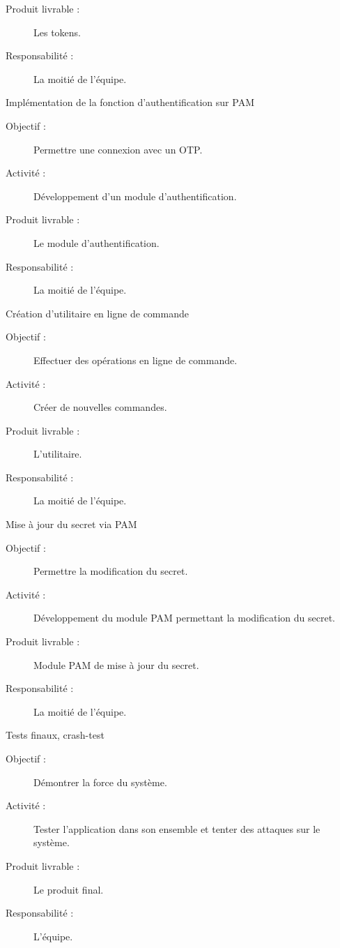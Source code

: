\documentclass{../../res/univ-projet}
\begin{document}
\begin{description}
\begin{description}
		        \item [Produit livrable :] Les tokens.
		        \item [Responsabilité :]  La moitié de l'équipe.
		    \end{description}
	    \item [Étape 9 :] Implémentation de la fonction d'authentification sur PAM
		    \begin{description}
		        \item [Objectif :] Permettre une connexion avec un OTP.
		        \item [Activité :] Développement d'un module d'authentification.
		        \item [Produit livrable :] Le module d'authentification.
		        \item [Responsabilité :]  La moitié de l'équipe.
		    \end{description}
	    \item [Étape 10 :] Création d'utilitaire en ligne de commande
		    \begin{description}
		        \item [Objectif :] Effectuer des opérations en ligne de commande.
		        \item [Activité :] Créer de nouvelles commandes.
		        \item [Produit livrable :] L'utilitaire.
		        \item [Responsabilité :]  La moitié de l'équipe.
		    \end{description}
	    \item [Étape 11 :] Mise à jour du secret via PAM
		    \begin{description}
		        \item [Objectif :] Permettre la modification du secret.
		        \item [Activité :] Développement du module PAM permettant la modification du secret.
		        \item [Produit livrable :] Module PAM de mise à jour du secret.
		        \item [Responsabilité :]  La moitié de l'équipe.
		    \end{description}
	    \item [Étape 12 :] Tests finaux, crash-test
		    \begin{description}
		        \item [Objectif :] Démontrer la force du système.
		        \item [Activité :] Tester l'application dans son ensemble et tenter des attaques sur le système.
		        \item [Produit livrable :] Le produit final.
		        \item [Responsabilité :]  L'équipe.
		    \end{description}
    \end{description}
    
\end{document}
